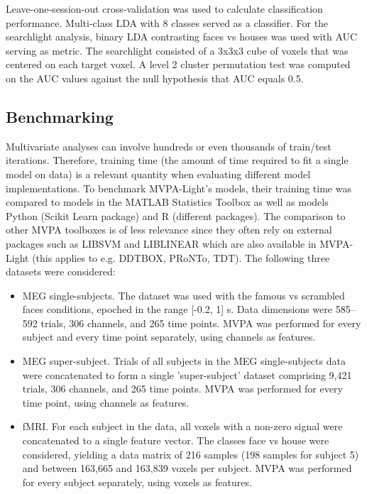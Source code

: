 \documentclass[utf8]{frontiersSCNS} %
\begin{document}
 Leave-one-session-out cross-validation was used to calculate classification performance. Multi-class LDA with 8 classes served as a classifier. For the searchlight analysis, binary LDA contrasting faces vs houses was used with AUC serving as metric. The searchlight consisted of a 3x3x3 cube of voxels that was centered on each target voxel. A level 2 cluster permutation test was computed on the AUC values against the null hypothesis that AUC equals 0.5. 

\subsection{Benchmarking}

Multivariate analyses can involve hundreds or even thousands of train/test iterations. Therefore,  training time (the amount of time required to fit a single model on data) is a relevant quantity when evaluating different model implementations. To benchmark MVPA-Light's models, their training time was compared to models in the MATLAB Statistics Toolbox as well as models Python (Scikit Learn package) and R (different packages). The comparison to other MVPA toolboxes is of less relevance since they often rely on external packages such as LIBSVM and LIBLINEAR which are also available in MVPA-Light (this applies to e.g. DDTBOX, PRoNTo, TDT). The following three datasets were considered:


\begin{itemize}
    \item MEG single-subjects. The \cite{Wakeman2015ADataset} dataset was used with the famous vs scrambled faces conditions, epoched in the range [-0.2, 1] s. Data dimensions were 585--592 trials, 306 channels, and 265 time points. MVPA was performed for every subject and every time point separately, using channels as features.
    \item MEG super-subject. Trials of all subjects in the MEG single-subjects data were concatenated to form a single 'super-subject' dataset comprising 9,421 trials, 306 channels, and 265 time points. MVPA was performed for every time point, using channels as features.
    \item fMRI. For each subject in the \cite{Haxby2001} data, all voxels with a non-zero signal were concatenated to a single feature vector. The classes face vs house were considered, yielding a data matrix of 216 samples (198 samples for subject 5) and between 163,665 and 163,839 voxels per subject. MVPA was performed for every subject separately, using voxels as features.
\end{itemize}
\end{document}
